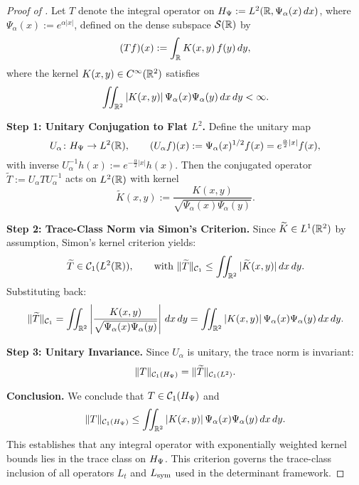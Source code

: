 \begin{proof}[Proof of ]
Let \( T \) denote the integral operator on \( H_{\Psi} := L^2(\mathbb{R}, \Psi_\alpha(x)\,dx) \), where \( \Psi_\alpha(x) := e^{\alpha |x|} \), defined on the dense subspace \( \mathcal{S}(\mathbb{R}) \) by
\[
(Tf)(x) := \int_{\mathbb{R}} K(x,y)\, f(y)\, dy,
\]
where the kernel \( K(x,y) \in C^\infty(\mathbb{R}^2) \) satisfies
\[
\iint_{\mathbb{R}^2} |K(x,y)|\, \Psi_\alpha(x)\Psi_\alpha(y)\, dx\,dy < \infty.
\]

\medskip
\noindent\textbf{Step 1: Unitary Conjugation to Flat \( L^2 \).}
Define the unitary map
\[
U_\alpha \colon H_{\Psi} \to L^2(\mathbb{R}), \qquad (U_\alpha f)(x) := \Psi_\alpha(x)^{1/2} f(x) = e^{\frac{\alpha}{2}|x|} f(x),
\]
with inverse \( U_\alpha^{-1} h(x) := e^{-\frac{\alpha}{2}|x|} h(x) \). Then the conjugated operator \( \widetilde{T} := U_\alpha T U_\alpha^{-1} \) acts on \( L^2(\mathbb{R}) \) with kernel
\[
\widetilde{K}(x,y) := \frac{K(x,y)}{\sqrt{\Psi_\alpha(x)\Psi_\alpha(y)}}.
\]

\medskip
\noindent\textbf{Step 2: Trace-Class Norm via Simon’s Criterion.}
Since \( \widetilde{K} \in L^1(\mathbb{R}^2) \) by assumption, Simon’s kernel criterion \cite[Thm.~4.2]{Simon2005TraceIdeals} yields:
\[
\widetilde{T} \in \mathcal{C}_1(L^2(\mathbb{R})), \qquad \text{with } \|\widetilde{T}\|_{\mathcal{C}_1} \le \iint_{\mathbb{R}^2} |\widetilde{K}(x,y)|\, dx\,dy.
\]
Substituting back:
\[
\|\widetilde{T}\|_{\mathcal{C}_1} = \iint_{\mathbb{R}^2} \left| \frac{K(x,y)}{\sqrt{\Psi_\alpha(x)\Psi_\alpha(y)}} \right|\, dx\,dy = \iint_{\mathbb{R}^2} |K(x,y)|\, \Psi_\alpha(x)\Psi_\alpha(y)\, dx\,dy.
\]

\medskip
\noindent\textbf{Step 3: Unitary Invariance.}
Since \( U_\alpha \) is unitary, the trace norm is invariant:
\[
\|T\|_{\mathcal{C}_1(H_{\Psi})} = \|\widetilde{T}\|_{\mathcal{C}_1(L^2)}.
\]

\medskip
\noindent\textbf{Conclusion.}
We conclude that \( T \in \mathcal{C}_1(H_{\Psi}) \) and
\[
\|T\|_{\mathcal{C}_1(H_{\Psi})} \le \iint_{\mathbb{R}^2} |K(x,y)|\, \Psi_\alpha(x)\Psi_\alpha(y)\, dx\,dy.
\]
This establishes that any integral operator with exponentially weighted kernel bounds lies in the trace class on \( H_{\Psi} \). This criterion governs the trace-class inclusion of all operators \( L_t \) and \( L_{\mathrm{sym}} \) used in the determinant framework.
\end{proof}

